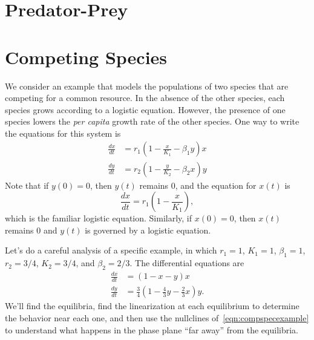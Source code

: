 \documentclass[reqno]{immbook}
\numberwithin{equation}{chapter}
\numberwithin{question}{section}
\numberwithin{theorem}{chapter}
\numberwithin{figure}{chapter}
\theoremstyle{definition}
\begin{document}
\section{Predator-Prey}
%
\section{Competing Species}
%
We consider an example that models the populations
of two species that are competing for a common resource.
In the absence of the other species, each species
grows according to a logistic equation.
However, the presence of one species lowers
the \emph{per capita} growth rate of the other species.
One way to write the equations for this system
is
\begin{equation}
\begin{split}
  \frac{dx}{dt} & = r_1\left(1-\frac{x}{K_1}-\beta_1 y\right)x \\
  \frac{dy}{dt} & = r_2\left(1-\frac{y}{K_2}-\beta_2 x\right)y
\end{split}
\end{equation}
Note that if $y(0)=0$, then $y(t)$ remains $0$, and
the equation for $x(t)$ is
\begin{equation}
    \frac{dx}{dt} = r_1 \left(1-\frac{x}{K_1}\right),
\end{equation}
which is the familiar logistic equation.
Similarly, if $x(0)=0$, then $x(t)$ remains $0$ and
$y(t)$ is governed by a logistic equation.

Let's do a careful analysis of a specific example,
in which $r_1 = 1$, $K_1 = 1$, $\beta_1 = 1$, 
$r_2 = 3/4$, $K_2 = 3/4$, and $\beta_2 = 2/3$.
The differential equations are
\begin{equation}
\begin{split}
  \frac{dx}{dt} & = (1-x-y)x \\
  \frac{dy}{dt} & = \frac{3}{4}\left(1 -\frac{4}{3}y - \frac{2}{3}x\right)y .
\end{split}
\label{eqn:compspecexample}
\end{equation}
We'll find the equilibria, find the linearization at each
equilibrium to determine the behavior near each one, and then
use the nullclines of~\eqref{eqn:compspecexample} to understand
what happens in the phase plane ``far away'' from the equilibria.
\end{document}
